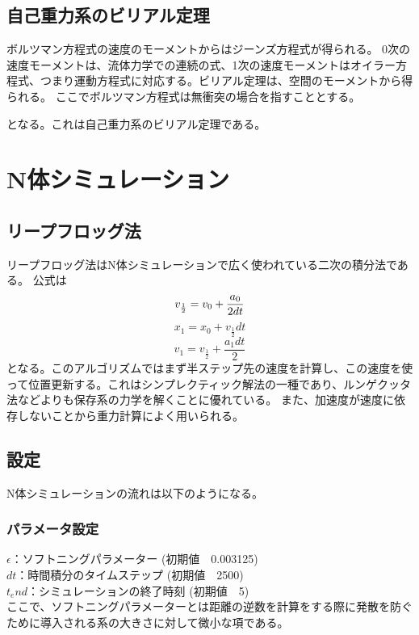 \documentclass{jsarticle}
\begin{document}
\subsection {自己重力系のビリアル定理}
ボルツマン方程式の速度のモーメントからはジーンズ方程式が得られる。
0次の速度モーメントは、流体力学での連続の式、1次の速度モーメントはオイラー方程式、つまり運動方程式に対応する。ビリアル定理は、空間のモーメントから得られる。
ここでボルツマン方程式は無衝突の場合を指すこととする。

となる。これは自己重力系のビリアル定理である。

\section {N体シミュレーション}
\subsection {リープフロッグ法}
リープフロッグ法はN体シミュレーションで広く使われている二次の積分法である。
公式は
\begin {equation}
    v_{\frac{1}{2}} = v_0 + \frac{a_0}{2dt}\\
\end {equation}
\begin {equation}
    x_1 = x_0 +v_{\frac{1}{2}}dt 
\end {equation}
\begin {equation}
    v_1 = v_{\frac{1}{2}} + \frac{a_1dt}{2}
\end {equation}
となる。このアルゴリズムではまず半ステップ先の速度を計算し、この速度を使って位置更新する。これはシンプレクティック解法の一種であり、ルンゲクッタ法などよりも保存系の力学を解くことに優れている。
また、加速度が速度に依存しないことから重力計算によく用いられる。
\subsection {設定}
N体シミュレーションの流れは以下のようになる。
\subsubsection{パラメータ設定}
$\epsilon$：ソフトニングパラメーター (初期値　0.003125)\\
$dt$：時間積分のタイムステップ (初期値　2500)\\
$t_end$：シミュレーションの終了時刻 (初期値　5)\\
ここで、ソフトニングパラメーターとは距離の逆数を計算をする際に発散を防ぐために導入される系の大きさに対して微小な項である。
\end{document}
